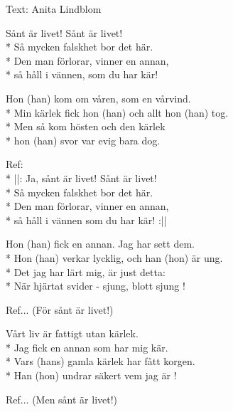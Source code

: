 \begin{SongText}
    \begin{SongInfo}
        Text: Anita Lindblom
    \end{SongInfo}
    \begin{SongVerse}
        Sånt är livet! Sånt är livet!\\*%
        Så mycken falskhet bor det här.\\*%
        Den man förlorar, vinner en annan,\\*%
        så håll i vännen, som du har kär!
    \end{SongVerse}
    \begin{SongVerse}
        Hon (han) kom om våren, som en vårvind.\\*%
        Min kärlek fick hon (han) och allt hon (han) tog.\\*%
        Men så kom hösten och den kärlek\\*%
        hon (han) svor var evig bara dog.
    \end{SongVerse}
    \begin{SongVerse}
        Ref:\\*%
        ||: Ja, sånt är livet! Sånt är livet!\\*%
        Så mycken falskhet bor det här.\\*%
        Den man förlorar, vinner en annan,\\*%
        så håll i vännen som du har kär! :||
    \end{SongVerse}
    \begin{SongVerse}
        Hon (han) fick en annan. Jag har sett dem.\\*%
        Hon (han) verkar lycklig, och han (hon) är ung.\\*%
        Det jag har lärt mig, är just detta:\\*%
        När hjärtat svider - sjung, blott sjung !
    \end{SongVerse}
    \begin{SongVerse}
        Ref... (För sånt är livet!)
    \end{SongVerse}
    \begin{SongVerse}
        Vårt liv är fattigt utan kärlek.\\*%
        Jag fick en annan som har mig kär.\\*%
        Vars (hans) gamla kärlek har fått korgen.\\*%
        Han (hon) undrar säkert vem jag är !
    \end{SongVerse}
    \begin{SongVerse}
        Ref... (Men sånt är livet!)
    \end{SongVerse}
\end{SongText}
